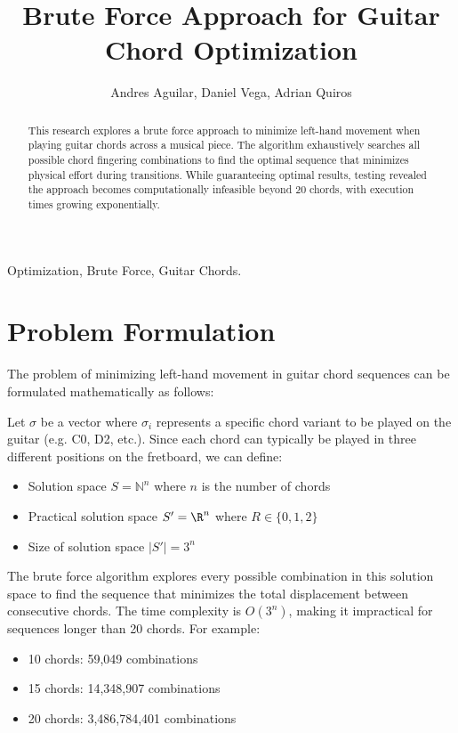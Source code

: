 \documentclass[lettersize,journal]{IEEEtran}
\begin{document}
\title{Brute Force Approach for Guitar Chord Optimization}
\author{Andres Aguilar, Daniel Vega, Adrian Quiros}

\maketitle

\begin{abstract}
This research explores a brute force approach to minimize left-hand movement when playing guitar chords across a musical piece. The algorithm exhaustively searches all possible chord fingering combinations to find the optimal sequence that minimizes physical effort during transitions. While guaranteeing optimal results, testing revealed the approach becomes computationally infeasible beyond 20 chords, with execution times growing exponentially.
\end{abstract}

\begin{IEEEkeywords}
Optimization, Brute Force, Guitar Chords.
\end{IEEEkeywords}

\section{Problem Formulation}
The problem of minimizing left-hand movement in guitar chord sequences can be formulated mathematically as follows:

Let $\sigma$ be a vector where $\sigma_i$ represents a specific chord variant to be played on the guitar (e.g. C0, D2, etc.). Since each chord can typically be played in three different positions on the fretboard, we can define:

\begin{itemize}
    \item Solution space $S = \mathbb{N}^n$ where $n$ is the number of chords
    \item Practical solution space $S' = \R^n$ where $R \in \{0,1,2\}$
    \item Size of solution space $|S'| = 3^n$
\end{itemize}

The brute force algorithm explores every possible combination in this solution space to find the sequence that minimizes the total displacement between consecutive chords. The time complexity is $O(3^n)$, making it impractical for sequences longer than 20 chords. For example:

\begin{itemize}
    \item 10 chords: 59,049 combinations
    \item 15 chords: 14,348,907 combinations
    \item 20 chords: 3,486,784,401 combinations
\end{itemize}
\end{document}
